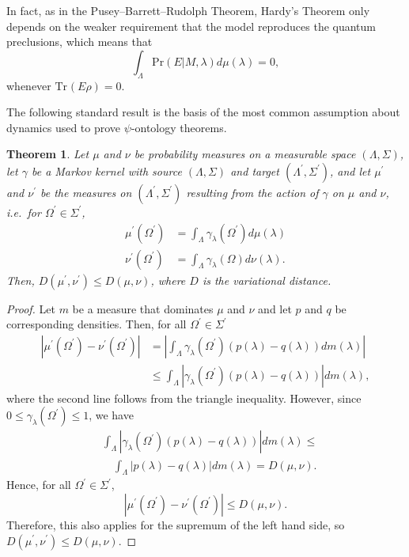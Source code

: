 \documentclass[DIV=calc,paper=a4,fontsize=11pt,twocolumn]{scrartcl} %
\theoremstyle{definition}
\theoremstyle{plain}
\newtheorem{theorem}[definition]{Theorem}
\newcommand{\Tr}[2][]{\ensuremath{\text{Tr}_{#1} \left ( #2 \right )}}
\begin{document}
In fact, as in the Pusey--Barrett--Rudolph Theorem, Hardy's Theorem only depends on the
weaker requirement that the model reproduces the quantum preclusions,
which means that
\begin{equation}
\int_{\Lambda} \text{Pr}(E|M,\lambda) d \mu(\lambda) = 0,
\end{equation}
whenever $\Tr{E \rho} = 0$.

The following standard result is the basis of the most common
assumption about dynamics used to prove $\psi$-ontology theorems.
\begin{theorem}
\label{prop:Dyn:contract}
Let $\mu$ and $\nu$ be probability measures on a measurable space
$(\Lambda,\Sigma)$, let $\gamma$ be a Markov kernel with source
$(\Lambda,\Sigma)$ and target $(\Lambda^{\prime},\Sigma^{\prime})$,
and let $\mu^{\prime}$ and $\nu^{\prime}$ be the measures on
$(\Lambda^{\prime},\Sigma^{\prime})$ resulting from the action of
$\gamma$ on $\mu$ and $\nu$, i.e.\ for $\Omega^{\prime} \in
\Sigma^{\prime}$,
\begin{align}
\mu^{\prime}(\Omega^{\prime}) & = \int_{\Lambda}
\gamma_{\lambda}(\Omega^{\prime})d\mu(\lambda) \\
\nu^{\prime}(\Omega^{\prime}) & = \int_{\Lambda}
\gamma_{\lambda}(\Omega) d\nu(\lambda).
\end{align}
Then, $D(\mu^{\prime},\nu^{\prime}) \leq D(\mu,\nu)$, where $D$ is
the variational distance.
\end{theorem}
\begin{proof}
Let $m$ be a measure that dominates $\mu$ and $\nu$ and let $p$ and
$q$ be corresponding densities.  Then, for all $\Omega^{\prime} \in
\Sigma^{\prime}$
\begin{align}
\left | \mu^{\prime}(\Omega^{\prime}) -
\nu^{\prime}(\Omega^{\prime}) \right | & =  \left |
\int_{\Lambda} \gamma_{\lambda}(\Omega^{\prime}) \left (
p(\lambda) - q (\lambda) \right )
dm(\lambda) \right | \\
& \leq \int_{\Lambda} \left | \gamma_{\lambda}(\Omega^{\prime})
\left ( p(\lambda) - q (\lambda) \right ) \right |dm(\lambda),
\end{align}
where the second line follows from the triangle inequality.
However, since $0 \leq \gamma_{\lambda}(\Omega^{\prime}) \leq 1$, we
have
\begin{align}
&\int_{\Lambda} \left | \gamma_{\lambda}(\Omega^{\prime}) \left (
p(\lambda) - q (\lambda) \right ) \right |dm(\lambda) \leq\nonumber\\
&\quad \int_{\Lambda} \left | p(\lambda) - q(\lambda) \right |
dm(\lambda) = D(\mu,\nu).
\end{align}
Hence, for all $\Omega^{\prime} \in \Sigma^{\prime}$,
\begin{equation}
\left | \mu^{\prime}(\Omega^{\prime}) -
\nu^{\prime}(\Omega^{\prime}) \right | \leq D(\mu,\nu).
\end{equation}
Therefore, this also applies for the supremum of the left hand side,
so $D(\mu^{\prime},\nu^{\prime}) \leq D(\mu,\nu)$.
\end{proof}
\end{document}
